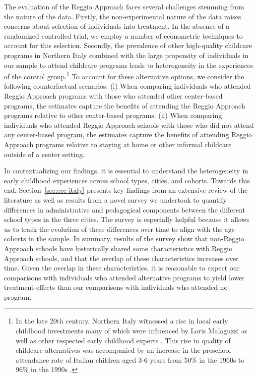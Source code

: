 The evaluation of the Reggio Approach faces several challenges stemming from the nature of the data. Firstly, the non-experimental nature of the data raises concerns about selection of individuals into treatment. In the absence of a randomized controlled trial, we employ a number of econometric techniques to account for this selection. Secondly, the prevalence of other high-quality childcare programs in Northern Italy combined with the large propensity of individuals in our sample to attend childcare programs leads to heterogeneity in the experiences of the control group.\footnote{In the late 20th century, Northern Italy witnessed a rise in local early childhood investments many of which were influenced by Loris Malaguzzi as well as other respected early childhood experts \citep{OECD_2001_Italy-Country-Note}. This rise in quality of childcare alternatives was accompanied by an increase in the preschool attendance rate of Italian children aged 3-6 years from 50\% in the 1960s to 96\% in the 1990s \citep{Hohnerlein_2015_Development-and-Diffusion}.} To account for these alternative options, we consider the following counterfactual scenarios. (i) When comparing individuals who attended Reggio Approach programs with those who attended other center-based programs, the estimates capture the benefits of attending the Reggio Approach programs relative to other center-based programs. (ii) When comparing individuals who attended Reggio Approach schools with those who did not attend any center-based program, the estimates capture the benefits of attending Reggio Approach programs relative to staying at home or other informal childcare outside of a center setting.

In contextualizing our findings, it is essential to understand the heterogeneity in early childhood experiences across school types, cities, and cohorts. Towards this end, Section~\ref{sec:ece-italy} presents key findings from an extensive review of the literature as well as results from a novel survey we undertook to quantify differences in administrative and pedagogical components between the different school types in the three cities. The survey is especially helpful because it allows us to track the evolution of these differences over time to align with the age cohorts in the sample. In summary, results of the survey show that non-Reggio Approach schools have historically shared some characteristics with Reggio Approach schools, and that the overlap of these characteristics increases over time. Given the overlap in these characteristics, it is reasonable to expect our comparisons with individuals who attended alternative programs to yield lower treatment effects than our comparisons with individuals who attended no program.

